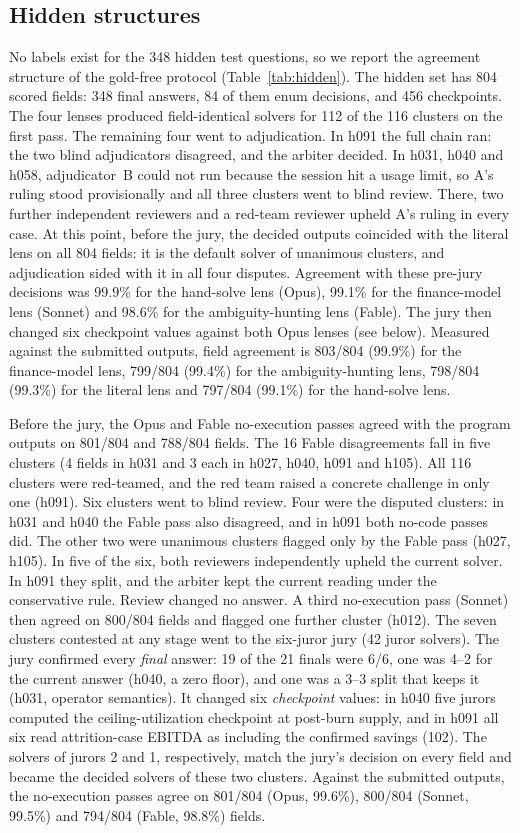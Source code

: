 \documentclass[conference]{IEEEtran}
\begin{document}
\subsection{Hidden structures}\label{sec:exp-hidden}
No labels exist for the 348 hidden test questions, so we report the agreement structure of the gold-free protocol
(Table~\ref{tab:hidden}). The hidden set has 804 scored fields: 348 final answers, 84 of them enum decisions, and 456
checkpoints. The four lenses produced field-identical solvers for 112 of the 116 clusters on the first
pass. The remaining four went to adjudication. In h091 the full chain ran: the two blind adjudicators disagreed, and
the arbiter decided. In h031, h040 and h058, adjudicator~B could not run because the session hit a usage limit, so
A's ruling stood provisionally and all three clusters went to blind review. There, two further independent
reviewers and a red-team reviewer upheld A's ruling in every case. At this point, before the jury, the decided outputs
coincided with the literal lens on all 804 fields: it is the default solver of unanimous clusters, and adjudication
sided with it in all four disputes. Agreement with these pre-jury decisions was 99.9\% for the hand-solve lens (Opus),
99.1\% for the finance-model lens (Sonnet) and 98.6\% for the ambiguity-hunting lens (Fable). The jury then changed six
checkpoint values against both Opus lenses (see below). Measured against the submitted outputs, field agreement is
803/804 (99.9\%) for the finance-model lens, 799/804 (99.4\%) for the ambiguity-hunting lens, 798/804 (99.3\%) for the
literal lens and 797/804 (99.1\%) for the hand-solve lens.

Before the jury, the Opus and Fable no-execution passes agreed with the program outputs on 801/804 and 788/804
fields. The 16 Fable disagreements fall in five clusters (4 fields in h031 and 3 each in h027, h040, h091 and h105).
All 116 clusters were red-teamed, and the red team raised a concrete challenge in only one (h091). Six
clusters went to blind review. Four were the disputed clusters: in h031 and h040 the Fable pass also disagreed, and
in h091 both no-code passes did. The other two were unanimous clusters flagged only by the Fable pass (h027, h105).
In five of the six, both reviewers independently upheld the current solver. In h091 they split, and the arbiter kept
the current reading under the conservative rule. Review changed no answer. A third no-execution pass (Sonnet) then
agreed on 800/804 fields and flagged one further cluster (h012). The seven clusters contested at any stage went to
the six-juror jury (42 juror solvers). The jury confirmed every \emph{final} answer: 19 of the 21 finals were 6/6, one was 4--2 for the
current answer (h040, a zero floor), and one was a 3--3 split that keeps it (h031, operator semantics). It changed six
\emph{checkpoint} values: in h040 five jurors computed the ceiling-utilization checkpoint at
post-burn supply, and in h091 all six read attrition-case EBITDA as including the confirmed savings (102). The
solvers of jurors 2 and 1, respectively, match the jury's decision on every field and became the decided solvers of
these two clusters. Against the
submitted outputs, the no-execution passes agree on 801/804 (Opus, 99.6\%), 800/804 (Sonnet, 99.5\%) and 794/804
(Fable, 98.8\%) fields.
\end{document}
